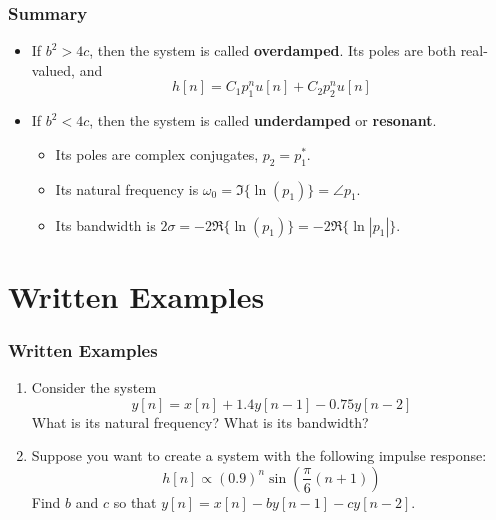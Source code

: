 \documentclass{beamer}
\begin{document}
\begin{frame}
  \frametitle{Summary}
  \begin{itemize}
  \item If $b^2>4c$, then the system is called {\bf overdamped}.  Its
    poles are both real-valued, and
    \begin{displaymath}
      h[n] = C_1p_1^n u[n] + C_2p_2^nu[n]
    \end{displaymath}
  \item If $b^2<4c$, then the system is called {\bf underdamped} or
    {\bf resonant}.
    \begin{itemize}
    \item Its poles are complex conjugates, $p_2=p_1^*$.
    \item Its natural frequency is $\omega_0=\Im\{\ln(p_1)\}=\angle p_1$.
    \item Its bandwidth is $2\sigma =-2\Re\{\ln(p_1)\}=-2\Re\{\ln|p_1|\}$.
    \end{itemize}
  \end{itemize}
\end{frame}

\section[Written Examples]{Written Examples}
\setcounter{subsection}{1}

\begin{frame}
  \frametitle{Written Examples}

  \begin{enumerate}
  \item Consider the system
    \begin{displaymath}
      y[n] = x[n] + 1.4 y[n-1] - 0.75 y[n-2]
    \end{displaymath}
    What is its natural frequency?  What is its bandwidth?
  \item Suppose you want to create a system with the following impulse response:
    \begin{displaymath}
      h[n] \propto (0.9)^n \sin\left(\frac{\pi}{6}(n+1)\right)
    \end{displaymath}
    Find $b$ and $c$ so that $y[n]=x[n]-by[n-1]-cy[n-2]$.
  \end{enumerate}
\end{frame}
\end{document}
